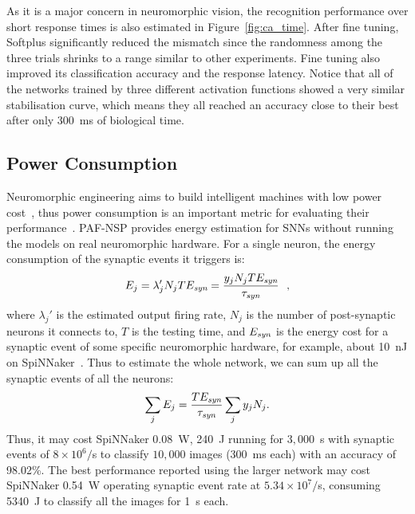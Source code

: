 \documentclass[10pt,journal,compsoc]{IEEEtran}
\begin{document}
	As it is a major concern in neuromorphic vision, the recognition performance over short response times is also estimated in Figure~\ref{fig:ca_time}.
	After fine tuning, Softplus significantly reduced the mismatch since the randomness among the three trials shrinks to a range similar to other experiments.
	Fine tuning also improved its classification accuracy and the response latency.
	Notice that all of the networks trained by three different activation functions showed a very similar stabilisation curve, which means they all reached an accuracy close to their best after only 300~ms of biological time. 
	
	
	\subsection{Power Consumption}
	Neuromorphic engineering aims to build intelligent machines with low power cost~\cite{furber2016large}, thus power consumption is an important metric for evaluating their performance~\cite{liu2016bench}.
	PAF-NSP provides energy estimation for SNNs without running the models on real neuromorphic hardware.
	For a single neuron, the energy consumption of the synaptic events it triggers is:
	\begin{equation}
	E_{j} = \lambda_j' N_j T E_{\textit{\textrm{syn}}} = \dfrac{y_j N_j T E_{\textit{\textrm{syn}}}}{\tau_{\textit{\textrm{syn}}}}~~,
	\label{equ:energy}
	\end{equation}
	where $\lambda_j'$ is the estimated output firing rate, $N_j$ is the number of post-synaptic neurons it connects to, $T$ is the testing time, and $E_{\textit{\textrm{syn}}}$ is the energy cost for a synaptic event of some specific neuromorphic hardware, for example, about 10~nJ on SpiNNaker~\cite{furber2016large}.
	Thus to estimate the whole network, we can sum up all the synaptic events of all the neurons:
	\begin{equation}
	\sum_j E_{j} =  \dfrac{T E_{\textit{\textrm{\textit{\textrm{syn}}}}}}{\tau_{\textit{\textrm{syn}}}} \sum_{j}y_j N_j.
	\end{equation}
	Thus, it may cost SpiNNaker 0.08~W, 240~J running for $3,000$~s with synaptic events of $8\times10^6/$s to classify $10,000$ images (300~ms each) with an accuracy of 98.02\%.
	The best performance reported using the larger network may cost SpiNNaker 0.54~W operating synaptic event rate at $5.34\times10^7/$s, consuming 5340~J to classify all the images for 1~s each.
	
\end{document}
